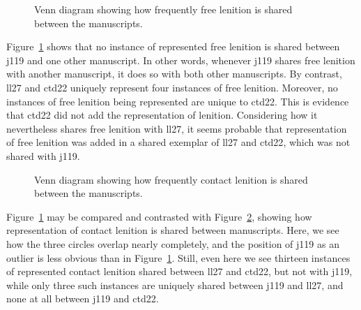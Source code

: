 \begin{figure}[h]
  \centering
  
  \caption{Venn diagram showing how frequently free lenition is shared between  the manuscripts.}
  \label{fig:vennfreelendewi}
\end{figure}
Figure~\ref{fig:vennfreelendewi} shows that no instance of represented free lenition  is shared between \gls{j119} and one other manuscript. In other words, whenever \gls{j119} shares free lenition with another manuscript, it does so with both other manuscripts. By contrast, \gls{ll27} and \gls{ctd22} uniquely represent four instances of free lenition. Moreover, no instances of free lenition being represented are unique to \gls{ctd22}. This is evidence that \gls{ctd22} did not add the representation of lenition. Considering how it nevertheless shares free lenition with \gls{ll27}, it seems probable that representation of free lenition was added in a shared exemplar of \gls{ll27} and \gls{ctd22}, which was not shared with \gls{j119}.


\begin{figure}[h]
  \centering
  
  \caption{Venn diagram showing how frequently contact lenition is shared between  the manuscripts.}
  \label{fig:venncontlendewi}
\end{figure}

Figure~\ref{fig:vennfreelendewi} may be compared and contrasted with Figure~\ref{fig:venncontlendewi}, showing how representation of contact lenition is shared between manuscripts. Here, we see how the three circles overlap nearly completely, and the position of \gls{j119} as an outlier is less obvious than in Figure~\ref{fig:vennfreelendewi}. Still, even here we see thirteen instances of represented contact lenition shared between \gls{ll27} and \gls{ctd22}, but not with \gls{j119}, while only three such instances are uniquely  shared between \gls{j119} and \gls{ll27}, and none at all between \gls{j119} and \gls{ctd22}.

